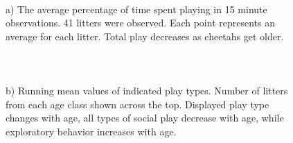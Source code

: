 \documentclass[12pt, letterpaper, fleqn]{article}
\begin{document}
\begin{figure}[h!]
\begin{center}
\begin{minipage}[t]{0.49\linewidth}
	    \end{minipage}\hfill
	    \begin{minipage}[t]{0.43\linewidth}
	      $~$\\
	      a) The average percentage of time spent playing in 15 minute observations. 41 litters were observed. Each point represents an average for each litter. Total play decreases as cheetahs get older. 
	      \\\\\\\\
	      b) Running mean values of indicated play types. Number of litters from each age class shown across the top. Displayed play type changes with age, all types of social play decrease with age, while exploratory behavior increases with age. 
	    \end{minipage}
	  \end{center}
	\end{figure}
	
\end{document}

